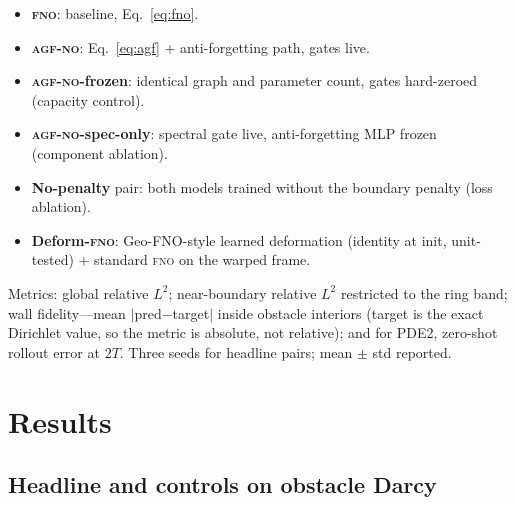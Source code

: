 \documentclass[11pt]{article}
\theoremstyle{definition}
\newcommand{\fno}{\textsc{fno}}
\newcommand{\agfno}{\textsc{agf-no}}
\begin{document}
\begin{itemize}
\item \textbf{\fno{}}: baseline, Eq.~\eqref{eq:fno}.
\item \textbf{\agfno{}}: Eq.~\eqref{eq:agf} + anti-forgetting path, gates live.
\item \textbf{\agfno{}-frozen}: identical graph and parameter count, gates
      hard-zeroed (capacity control).
\item \textbf{\agfno{}-spec-only}: spectral gate live, anti-forgetting MLP
      frozen (component ablation).
\item \textbf{No-penalty} pair: both models trained without the boundary
      penalty (loss ablation).
\item \textbf{Deform-\fno{}}: Geo-FNO-style learned deformation
      (identity at init, unit-tested) + standard \fno{} on the warped frame.
\end{itemize}

Metrics: global relative $L^2$; near-boundary relative $L^2$ restricted to
the ring band; wall fidelity---mean $|$pred$-$target$|$ inside obstacle
interiors (target is the exact Dirichlet value, so the metric is absolute,
not relative); and for PDE2, zero-shot rollout error at $2T$.
Three seeds for headline pairs; mean $\pm$ std reported.

\section{Results}
\label{sec:results}

\subsection{Headline and controls on obstacle Darcy}
\label{sec:controls}
\end{document}
